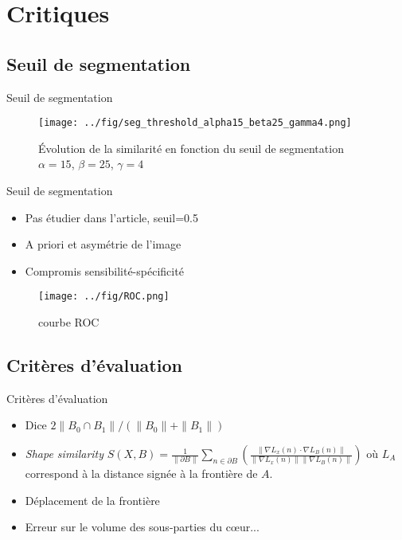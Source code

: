 \documentclass{beamer}
\begin{document}
\section{Critiques}
\subsection*{Seuil de segmentation}
\begin{frame}{Seuil de segmentation}
\begin{figure}[h]
  \begin{center}
    \caption{Évolution de la similarité en fonction du seuil de segmentation $\alpha=15$, $\beta=25$, $\gamma=4$}
    \texttt{[image: ../fig/seg\_threshold\_alpha15\_beta25\_gamma4.png]}
    \label{fig:seg_threshold}
  \end{center}
\end{figure}
\end{frame}

\begin{frame}{Seuil de segmentation}
\begin{itemize}
\item Pas étudier dans l'article, seuil=0.5
\item A priori et asymétrie de l'image
\item Compromis sensibilité-spécificité
\end{itemize}
\begin{figure}[h!]
  \begin{center}
    \caption{courbe ROC}
    \texttt{[image: ../fig/ROC.png]}
  \end{center}
\end{figure}
\end{frame}

\subsection{Critères d'évaluation}
\begin{frame}{Critères d'évaluation}
\begin{itemize}
\item Dice $2 \| B_0 \cap B_1 \| / ( \| B_0 \| + \| B_1 \| )$ 
\item \textit{Shape similarity} $ S(X,B)= \frac{1}{\|\partial B \|} \sum_{n \in \partial B}{ \left( \frac{\|\nabla L_x(n) \cdot \nabla L_B(n) \|}{\|\nabla L_x(n)\| \| \nabla L_B(n) \|} \right)} $ où $L_A$ correspond à la distance signée à la frontière de $A$.
\item Déplacement de la frontière
\item Erreur sur le volume des sous-parties du cœur...
\end{itemize}
\end{frame}
\end{document}
